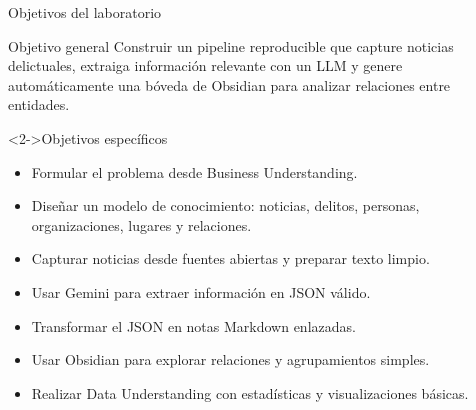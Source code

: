 \documentclass[11pt,aspectratio=169]{beamer}
\begin{document}
\begin{frame}{Objetivos del laboratorio}
\scriptsize
\begin{block}{Objetivo general}
Construir un pipeline reproducible que capture noticias delictuales, extraiga información relevante con un LLM y genere automáticamente una bóveda de Obsidian para analizar relaciones entre entidades.
\end{block}

\begin{block}<2->{Objetivos específicos}
\begin{itemize}[<+->]
\item Formular el problema desde Business Understanding.
\item Diseñar un modelo de conocimiento: noticias, delitos, personas, organizaciones, lugares y relaciones.
\item Capturar noticias desde fuentes abiertas y preparar texto limpio.
\item Usar Gemini para extraer información en JSON válido.
\item Transformar el JSON en notas Markdown enlazadas.
\item Usar Obsidian para explorar relaciones y agrupamientos simples.
\item Realizar Data Understanding con estadísticas y visualizaciones básicas.
\end{itemize}
\end{block}
\end{frame}
\end{document}
